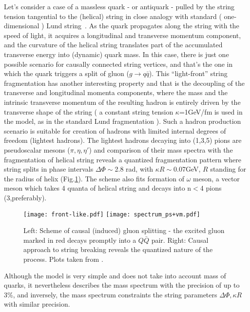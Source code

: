 \documentclass[Physsubmission, Phys]{SciPost}
\begin{document}
  Let's consider a case of a massless quark - or antiquark - pulled by the string
  tension tangential to the (helical) string in close analogy with
  standard ( one-dimensional ) Lund string~\cite{lund}. As the quark propagates
  along the string with the speed of light, it acquires a longitudinal
  and transverse momentum component, and the curvature of the helical
 string translates part of the accumulated transverse energy into
 (dynamic) quark
 mass.  In this case, there is just one possible scenario for causally
 connected string vertices, and that's the one in which the quark
 triggers a split of gluon ($g\rightarrow q\bar{q}$). This
 ``light-front'' string fragmentation has another interesting property
 and that is the decoupling of the transverse and longitudinal momenta
 components, where the mass and the intrinsic transverse momentum of
 the resulting hadron is entirely driven by the transverse shape of
 the string ( a constant string tension $\kappa$=1GeV/fm is used in
 the model, as in the standard Lund fragmentation ).
Such a hadron
 production scenario is suitable for creation of hadrons with limited
 internal degrees of freedom (lightest hadrons).  The lightest hadrons
 decaying into (1,3,5) pions are pseudoscalar mesons
 ($\pi,\eta,\eta'$) and comparison of their mass spectra with the
 fragmentation of helical string reveals a quantized fragmentation
 pattern where string splits in phase intervals $\Delta\Phi\sim$2.8
 rad, with $\kappa R\sim$0.07GeV, $R$ standing for the radius of
 helix (Fig.\ref{fig:light-front}).  The scheme also fits formation of $\omega$ meson, a vector
 meson which takes 4 quanta of helical string and decays into n$<$4
 pions (3,preferably). 

\begin{figure}[h]
\centering
\texttt{[image: front-like.pdf]}
\texttt{[image: spectrum\_ps+vm.pdf]}
\caption{ Left: Scheme of causal (induced) gluon splitting - the
  excited gluon marked in red decays promptly into a $Q\bar{Q}$
  pair. Right: Causal approach to string breaking reveals the
  quantized nature of the process. Plots taken from \cite{baryons}.
\label{fig:light-front}}
\end{figure}

Although the model is very simple and does not take into account mass
of quarks, it nevertheless describes the mass spectrum with
the precision of up to 3\%, and inversely, the mass spectrum
constraints the string parameters $\Delta\Phi, \kappa R$ with similar precision.
\end{document}
